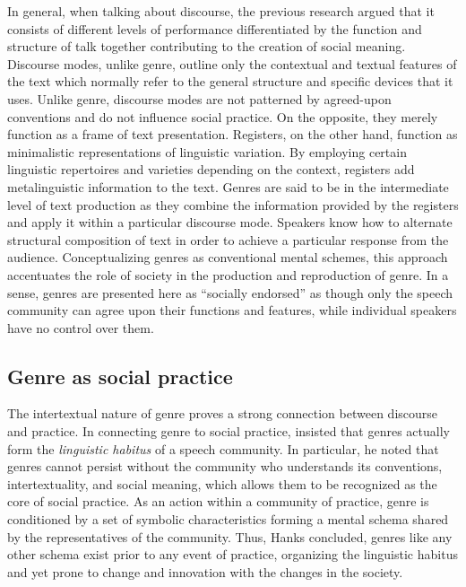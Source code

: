 \documentclass[12pt, draft]{article}
\begin{document}
In general, when talking about discourse, the previous research argued that it consists of different levels of performance differentiated by the function and structure of talk together contributing to the creation of social meaning. Discourse modes, unlike genre, outline only the contextual and textual features of the text which normally refer to the general structure and specific devices that it uses. Unlike genre, discourse modes are not patterned by agreed-upon conventions and do not influence social practice. On the opposite, they merely function as a frame of text presentation. Registers, on the other hand, function as minimalistic representations of linguistic variation. By employing certain linguistic repertoires and varieties depending on the context, registers add metalinguistic information to the text. Genres are said to be in the intermediate level of text production as they combine the information provided by the registers and apply it within a particular discourse mode. Speakers know how to alternate structural composition of text in order to achieve a particular response from the audience. Conceptualizing genres as conventional mental schemes, this approach accentuates the role of society in the production and reproduction of genre. In a sense, genres are presented here as ``socially endorsed'' \parencite[p. 60]{bax2011} as though only the speech community can agree upon their functions and features, while individual speakers have no control over them.  
\subsection{Genre as social practice}
The intertextual nature of genre proves a strong connection between discourse and practice. In connecting genre to social practice, \textcite{hanks1987} insisted that genres actually form the \textit{linguistic habitus} of a speech community. In particular, he noted that genres cannot persist without the community who understands its conventions, intertextuality, and social meaning, which allows them to be recognized as the core of social practice. As an action within a community of practice, genre is conditioned by a set of symbolic characteristics forming a mental schema shared by the representatives of the community. Thus, Hanks concluded, genres like any other schema exist prior to any event of practice, organizing the linguistic habitus and yet prone to change and innovation with the changes in the society.
\end{document}
